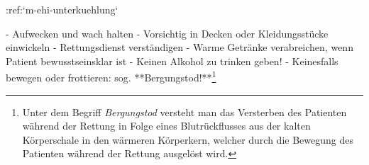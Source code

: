 :ref:`m-ehi-unterkuehlung`
\begin{itemize}
  -   Aufwecken und wach halten
  -   Vorsichtig in Decken oder Kleidungsstücke einwickeln
  -   Rettungsdienst verständigen
  -   Warme Getränke verabreichen, wenn Patient bewusstseinsklar ist
  -   Keinen Alkohol zu trinken geben!
  -   Keinesfalls bewegen oder frottieren: sog.
  **Bergungstod!**\footnote{Unter dem Begriff \emph{Bergungstod} versteht
  man das Versterben des Patienten während der Rettung in Folge eines Blutrückflusses
  aus der kalten Körperschale in den wärmeren Körperkern, welcher durch die
  Bewegung des Patienten während der Rettung ausgelöst wird.}
\end{itemize}
